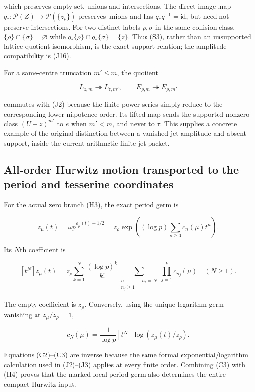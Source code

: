 which preserves empty set, unions and intersections. The direct-image map \(q_*:\mathcal P(Z)\longrightarrow\mathcal P(\{z_\rho\})\) preserves unions and has \(q_*q^{-1}=\mathrm{id}\), but need not preserve intersections. For two distinct labels \(\rho ,\sigma\) in the same collision class, \(\{\rho\}\cap\{\sigma\}=\varnothing\) while \(q_*\{\rho\}\cap q_*\{\sigma\}=\{z\}\). Thus (S3), rather than an unsupported lattice quotient isomorphism, is the exact support relation; the amplitude compatibility is (J16).

For a same-centre truncation \(m'\le m\), the quotient

\[
L_{z,m}\twoheadrightarrow L_{z,m'},\qquad
E_{\rho,m}\twoheadrightarrow E_{\rho,m'}
\]

commutes with (J2) because the finite power series simply reduce to the corresponding lower nilpotence order. Its lifted map sends the supported nonzero class \((U-z)^{m'}\) to \(e\) when \(m'<m\), and never to \(\tau\). This supplies a concrete example of the original distinction between a vanished jet amplitude and absent support, inside the current arithmetic finite-jet packet.

\subsection{All-order Hurwitz motion transported to the period and tesserine coordinates}\label{all-order-hurwitz-motion-transported-to-the-period-and-tesserine-coordinates}

For the actual zero branch (H3), the exact period germ is

\[
z_\mu(t)=\omega p^{\rho_\mu(t)-1/2}
=z_\rho\exp\left((\log p)\sum_{n\ge1}c_n(\mu)t^n\right).
\tag{C1}
\]

Its \(N\)th coefficient is

\[
[t^N]z_\mu(t)=z_\rho
\sum_{k=1}^N\frac{(\log p)^k}{k!}
\sum_{\substack{n_1+\cdots+n_k=N\\n_j\ge1}}
\prod_{j=1}^kc_{n_j}(\mu)
\quad(N\ge1).
\tag{C2}
\]

The empty coefficient is \(z_\rho\). Conversely, using the unique logarithm germ vanishing at \(z_\mu /z_\rho =1\),

\[
c_N(\mu)=\frac1{\log p}[t^N]
\log\left(z_\mu(t)/z_\rho\right).
\tag{C3}
\]

Equations (C2)--(C3) are inverse because the same formal exponential/logarithm calculation used in (J2)--(J3) applies at every finite order. Combining (C3) with (H4) proves that the marked local period germ also determines the entire compact Hurwitz input.

